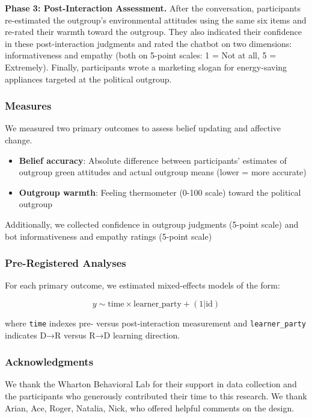 \documentclass[
  11pt,
  oneside]{article}
\providecommand{\tightlist}{%
  \setlength{\itemsep}{0pt}\setlength{\parskip}{0pt}}\usepackage{longtable,booktabs,array}
\begin{document}
\textbf{Phase 3: Post-Interaction Assessment.} After the conversation,
participants re-estimated the outgroup's environmental attitudes using
the same six items and re-rated their warmth toward the outgroup. They
also indicated their confidence in these post-interaction judgments and
rated the chatbot on two dimensions: informativeness and empathy (both
on 5-point scales: 1 = Not at all, 5 = Extremely). Finally, participants
wrote a marketing slogan for energy-saving appliances targeted at the
political outgroup.

\subsubsection{Measures}\label{measures}

We measured two primary outcomes to assess belief updating and affective
change.

\begin{itemize}
\tightlist
\item
  \textbf{Belief accuracy}: Absolute difference between participants'
  estimates of outgroup green attitudes and actual outgroup means (lower
  = more accurate)
\item
  \textbf{Outgroup warmth}: Feeling thermometer (0-100 scale) toward the
  political outgroup
\end{itemize}

Additionally, we collected confidence in outgroup judgments (5-point
scale) and bot informativeness and empathy ratings (5-point scale)

\subsubsection{Pre-Registered Analyses}\label{pre-registered-analyses}

For each primary outcome, we estimated mixed-effects models of the form:

\[y \sim \text{time} \times \text{learner\_party} + (1 | \text{id})\]

where \texttt{time} indexes pre- versus post-interaction measurement and
\texttt{learner\_party} indicates D→R versus R→D learning direction.

\subsubsection{Acknowledgments}\label{acknowledgments}

We thank the Wharton Behavioral Lab for their support in data collection
and the participants who generously contributed their time to this
research. We thank Arian, Ace, Roger, Natalia, Nick, who offered helpful
comments on the design.
\end{document}
